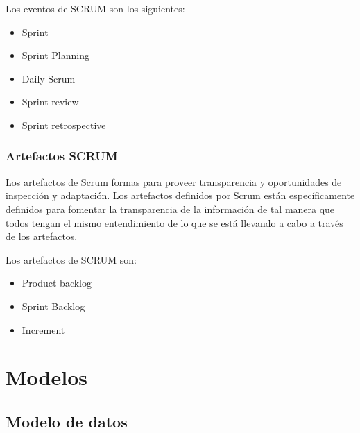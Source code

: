 \documentclass[a4paper, 12pt]{article}
\begin{document}
				Los eventos de SCRUM son los siguientes:
				
				\begin{itemize}
					\item Sprint 
					\item Sprint Planning
					\item Daily Scrum
					\item Sprint review
					\item Sprint retrospective
				\end{itemize}
			\subsubsection{Artefactos SCRUM}
				Los artefactos de Scrum formas para proveer transparencia y oportunidades de inspección y adaptación. Los artefactos definidos por Scrum están específicamente definidos para fomentar la transparencia de la información de tal manera que todos tengan el mismo entendimiento
				de lo que se está llevando a cabo a través de los artefactos.
				
				Los artefactos de SCRUM son:
				
				\begin{itemize}
					\item Product backlog 
					\item Sprint Backlog
					\item Increment
				\end{itemize}
	\section{Modelos}
		\subsection{Modelo de datos}
		
		
\end{document}
